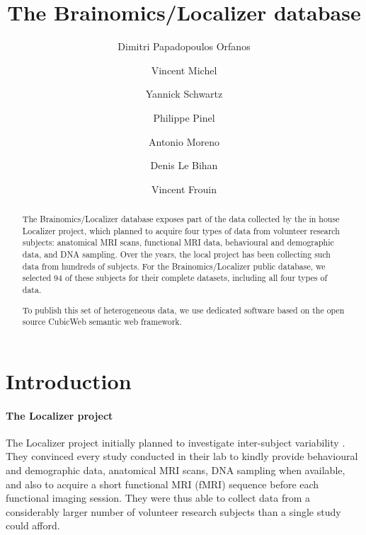 \documentclass[review]{elsarticle}
\begin{document}
\begin{frontmatter}

\title{The Brainomics/Localizer database}

\author[Neurospin]{Dimitri Papadopoulos Orfanos}
\author[Logilab]{Vincent Michel}
\author[Parietal,Neurospin]{Yannick Schwartz}
\author[U992,Neurospin,ParisSud]{Philippe Pinel}
\author[U992,Neurospin,ParisSud]{Antonio Moreno}
\author[Neurospin]{Denis Le Bihan}
\author[Neurospin]{Vincent Frouin}

\address[Neurospin]{CEA, DSV/I2BM, NeuroSpin, 91191 Gif-sur-Yvette, France}
\address[U992]{INSERM, U992, Cognitive Neuroimaging Unit, 91191 Gif-sur-Yvette, France}
\address[Parietal]{Parietal team, Institut National de Recherche en Informatique et Automatique, Palaiseau, France}
\address[ParisSud]{Univ. Paris-Sud, Cognitive Neuroimaging Unit, 91191 Gif-sur-Yvette, France}
\address[Logilab]{Logilab, 104 boulevard Auguste Blanqui, 75013 Paris, France}

\begin{abstract}
The Brainomics/Localizer database exposes part of the data collected by
the in house Localizer project, which planned to acquire four types of
data from volunteer research subjects: anatomical MRI scans, functional MRI
data, behavioural and demographic data, and DNA sampling. Over the years, the
local project has been collecting such data from hundreds of subjects. For the
Brainomics/Localizer public database, we selected 94 of these subjects for their
complete datasets, including all four types of data.

To publish this set of heterogeneous data, we use dedicated software based on
the open source CubicWeb semantic web framework.
\end{abstract}

\end{frontmatter}


\section{Introduction}

\paragraph{The Localizer project} The Localizer project initially planned to investigate inter-subject variability \cite{Pinel2007}. They convinced every study conducted in their lab to kindly provide behavioural and demographic data, anatomical MRI scans, DNA sampling when available, and also to acquire a short functional MRI (fMRI) sequence before each functional imaging session. They were thus able to collect data from a considerably larger number of volunteer research subjects than a single study could afford. 
\end{document}
